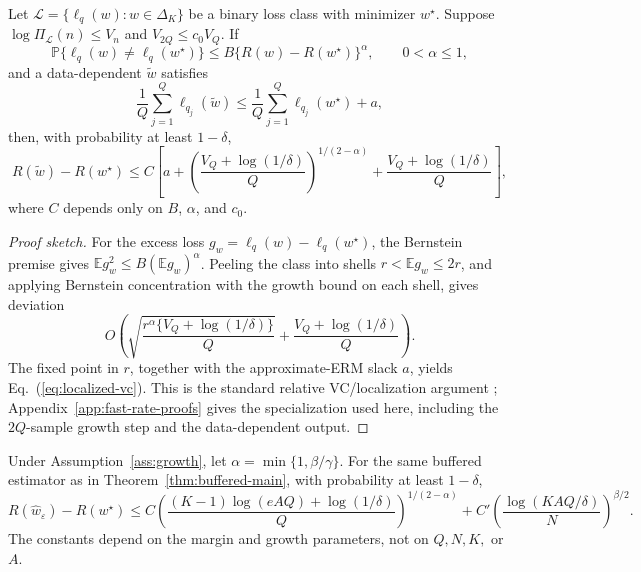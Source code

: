 \begin{lemma}
\label{lem:localized-vc}
Let \(\mathcal L=\{\ell_q(w):w\in\Delta_K\}\) be a binary loss class with
minimizer \(w^\star\).  Suppose
\(\log\Pi_{\mathcal L}(n)\le V_n\) and \(V_{2Q}\le c_0V_Q\).  If
\[
\mathbb P\{\ell_q(w)\ne\ell_q(w^\star)\}
\le
B\{R(w)-R(w^\star)\}^{\alpha},
\qquad 0<\alpha\le1,
\]
and a data-dependent \(\widetilde w\) satisfies
\[
\frac1Q\sum_{j=1}^Q\ell_{q_j}(\widetilde w)
\le
\frac1Q\sum_{j=1}^Q\ell_{q_j}(w^\star)+a,
\]
then, with probability at least \(1-\delta\),
\begin{equation}
R(\widetilde w)-R(w^\star)
\le
C\left[
a+
\left(\frac{V_Q+\log(1/\delta)}{Q}\right)^{1/(2-\alpha)}
+\frac{V_Q+\log(1/\delta)}{Q}
\right],
\label{eq:localized-vc}
\end{equation}
where \(C\) depends only on \(B\), \(\alpha\), and \(c_0\).
\end{lemma}

\begin{proof}[Proof sketch]
For the excess loss \(g_w=\ell_q(w)-\ell_q(w^\star)\), the Bernstein premise
gives \(\mathbb E g_w^2\le B(\mathbb E g_w)^\alpha\).  Peeling the class into
shells \(r<\mathbb E g_w\le2r\), and applying Bernstein concentration with
the growth bound on each shell, gives deviation
\[
O\!\left(
\sqrt{\frac{r^\alpha\{V_Q+\log(1/\delta)\}}{Q}}
+\frac{V_Q+\log(1/\delta)}{Q}
\right).
\]
The fixed point in \(r\), together with the approximate-ERM slack \(a\),
yields Eq.~(\ref{eq:localized-vc}).  This is the standard relative
VC/localization argument \citep{massart2006risk,bartlett2005local,
koltchinskii2006local}; Appendix~\ref{app:fast-rate-proofs} gives the
specialization used here, including the \(2Q\)-sample growth step and the
data-dependent output.
\end{proof}

\begin{theorem}
\label{thm:fast}
Under Assumption~\ref{ass:growth}, let
\(\alpha=\min\{1,\beta/\gamma\}\).  For the same buffered estimator as in
Theorem~\ref{thm:buffered-main}, with probability at least \(1-\delta\),
\begin{equation}
R(\widehat w_\varepsilon)-R(w^\star)
\le
C
\left(
\frac{(K-1)\log(eAQ)+\log(1/\delta)}{Q}
\right)^{1/(2-\alpha)}
+
C'
\left(
\frac{\log(KAQ/\delta)}{N}
\right)^{\beta/2}.
\label{eq:fast-rate}
\end{equation}
The constants depend on the margin and growth parameters, not on
\(Q,N,K,\) or \(A\).
\end{theorem}

